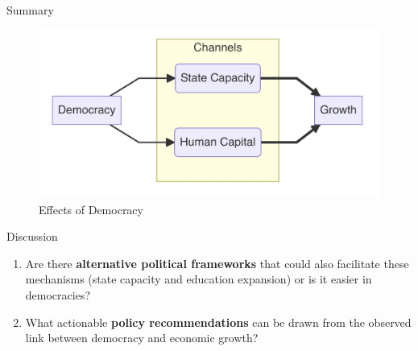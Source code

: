 \documentclass[
  ignorenonframetext,
]{beamer}
\providecommand{\tightlist}{%
  \setlength{\itemsep}{0pt}\setlength{\parskip}{0pt}}\usepackage{longtable,booktabs,array}
\begin{document}
\begin{frame}{Summary}
\protect\hypertarget{summary}{}
\begin{figure}

{\centering \includegraphics{../images/2023-12-06_17-17-36.jpg}

}

\caption{Effects of Democracy}

\end{figure}
\end{frame}

\begin{frame}{Discussion}
\protect\hypertarget{discussion}{}
\begin{enumerate}
\tightlist
\item
  Are there \textbf{alternative political frameworks} that could also
  facilitate these mechanisms (state capacity and education expansion)
  or is it easier in democracies?
\item
  What actionable \textbf{policy recommendations} can be drawn from the
  observed link between democracy and economic growth?
\end{enumerate}
\end{frame}
\end{document}
